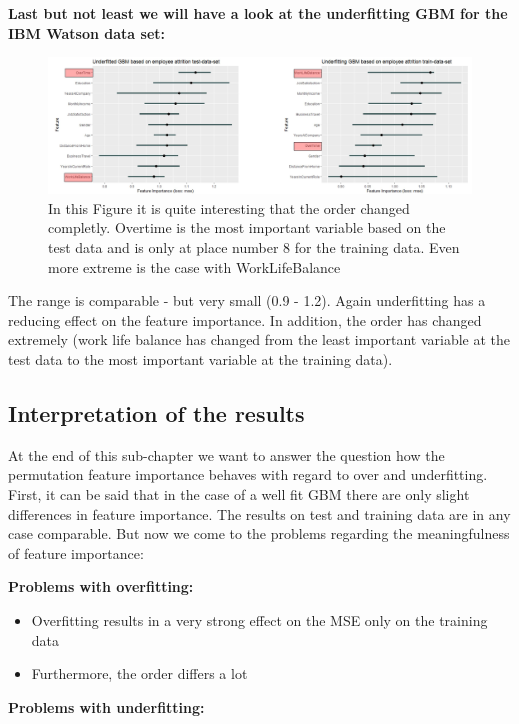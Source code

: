 \documentclass[]{krantz}
\providecommand{\tightlist}{%
  \setlength{\itemsep}{0pt}\setlength{\parskip}{0pt}}
\begin{document}
\textbf{Last but not least we will have a look at the underfitting GBM
for the IBM Watson data set:}

\begin{figure}
\includegraphics[width=40.29in]{images/IBM_under} \caption{In this Figure it is quite interesting that the order changed completly. Overtime is the most important variable based on the test data and is only at place number 8 for the training data. Even more extreme is the case with WorkLifeBalance}\label{fig:unnamed-chunk-59}
\end{figure}

The range is comparable - but very small (0.9 - 1.2). Again underfitting
has a reducing effect on the feature importance. In addition, the order
has changed extremely (work life balance has changed from the least
important variable at the test data to the most important variable at
the training data).

\subsection{Interpretation of the
results}\label{interpretation-of-the-results}

At the end of this sub-chapter we want to answer the question how the
permutation feature importance behaves with regard to over and
underfitting. First, it can be said that in the case of a well fit GBM
there are only slight differences in feature importance. The results on
test and training data are in any case comparable. But now we come to
the problems regarding the meaningfulness of feature importance:

\textbf{Problems with overfitting:}

\begin{itemize}
\tightlist
\item
  Overfitting results in a very strong effect on the MSE only on the
  training data
\item
  Furthermore, the order differs a lot
\end{itemize}

\textbf{Problems with underfitting:}
\end{document}
